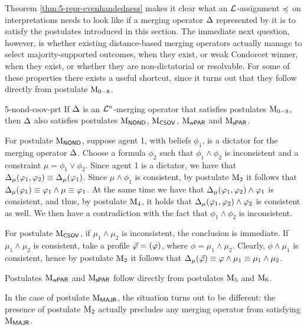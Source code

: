 Theorem \ref{thm:5-repr-evenhandedness} makes it clear what an $\L$-assignment $\as$ on interpretations
needs to look like if a merging operator $\me$ represented by it 
is to satisfy the postulates introduced in this section.
The immediate next question, however, is whether existing distance-based 
merging operators actually manage to select majority-supported outcomes, when they exist,
or weak Condorcet winner, when they exist, or whether they are non-dictatorial or resolvable.
For some of these properties there exists a useful shortcut,
since it turns out that they follow directly from postulate $\ppm{0-8}$.

\begin{prp}{}{5-nond-csov-prt}
	If $\me$ is an $\L^{n}$-merging operator that satisfies postulates $\ppm{0-8}$,
	then $\me$ also satisfies postulates $\ppm{\NOND}$, $\ppm{\CSOV}$, $\ppm{\WPRT}$ and $\ppm{\SPRT}$.
\end{prp}
\begin{prf*}{}{}%
	For postulate $\ppm{\NOND}$,
	suppose agent 1, with beliefs $\phi_1$, is a dictator for the merging operator $\me$. 
	Choose a formula $\phi_2$ such that $\phi_1 \land \phi_2$ is inconsistent 
	and a constraint $\mu = \phi_1 \lor \phi_2$.
	Since agent 1 is a dictator, we have that $\me_{\mu}(\phi_1, \phi_2)\equiv \me_{\mu}(\phi_1)$.
	Since $\mu \land \phi_1 $ is consistent, by postulate $\ppm{2}$ 
	it follows that $\me_{\mu}(\phi_1) \equiv \phi_1\land \mu \equiv \phi_1$. 
	At the same time we have that $\me_\mu(\phi_1,\phi_2) \land \phi_1$ is consistent, 
	and thus, by postulate $\ppm{4}$, 
	it holds that $\me_{\mu}(\phi_1,\phi_2) \land \phi_2$ is consistent as well. 
	We then have a contradiction with the fact that $\phi_1 \land \phi_2$ is inconsistent.

	For postulate $\ppm{\CSOV}$,
	if $\mu_1\land\mu_2$ is inconsistent, the conclusion is immediate.
	If $\mu_1\land\mu_2$ is consistent,
	take a profile $\P = (\phi)$,
	where $\phi=\mu_1\land\mu_2$.
	Clearly, $\phi \land \mu_1$ is consistent, hence by postulate $\ppm{2}$ 
	it follows that $\me_{\mu}(\P) \equiv \phi\land\mu_1\equiv\mu_1\land\mu_2$.

	Postulates $\ppm{\WPRT}$ and $\ppm{\SPRT}$ follow directly from postulates $\ppm{5}$ and $\ppm{6}$.
\end{prf*}

In the case of postulate $\ppm{\MAJR}$, the situation turns out to be different:
the presence of postulate $\ppm{2}$ actually precludes any merging operator 
from satisfying $\ppm{\MAJR}$.

